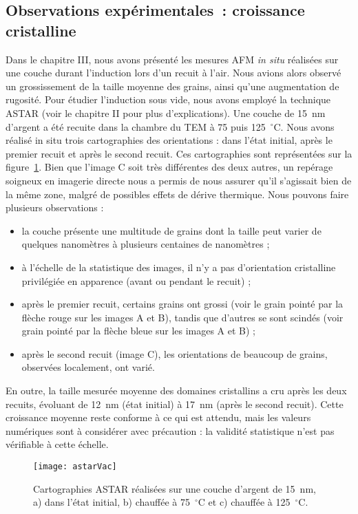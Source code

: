		\subsection{Observations expérimentales~: croissance cristalline}
Dans le chapitre III, nous avons présenté les mesures AFM \textit{in situ} réalisées sur une couche durant l’induction lors d’un recuit à l’air. Nous avions alors observé un grossissement de la taille moyenne des grains, ainsi qu’une augmentation de rugosité. Pour étudier l’induction sous vide, nous avons employé la technique ASTAR (voir le chapitre II pour plus d’explications). Une couche de 15~nm d’argent a été recuite dans la chambre du TEM à 75 puis 125~$^\circ$C. Nous avons réalisé in situ trois cartographies des orientations : dans l’état initial, après le premier recuit et après le second recuit. Ces cartographies sont représentées sur la figure~\ref{astarVac}. Bien que l’image C soit très différentes des deux autres, un repérage soigneux en imagerie directe nous a permis de nous assurer qu’il s’agissait bien de la même zone, malgré de possibles effets de dérive thermique. Nous pouvons faire plusieurs observations :
\begin{itemize}
\item la couche présente une multitude de grains dont la taille peut varier de quelques nanomètres à plusieurs centaines de nanomètres ;
\item à l'échelle de la statistique des images, il n’y a pas d’orientation cristalline privilégiée en apparence (avant ou pendant le recuit) ;
\item après le premier recuit, certains grains ont grossi (voir le grain pointé par la flèche rouge sur les images A et B), tandis que d’autres se sont scindés (voir grain pointé par la flèche bleue sur les images A et B) ;
\item après le second recuit (image C), les orientations de beaucoup de grains, observées localement, ont varié.
\end{itemize}
En outre, la taille mesurée moyenne des domaines cristallins a cru après les deux recuits, évoluant de 12~nm (état initial) à 17~nm (après le second recuit). Cette croissance moyenne reste conforme à ce qui est attendu, mais les valeurs numériques sont à considérer avec précaution : la validité statistique n’est pas vérifiable à cette échelle.\par 
\begin{figure}[!htb]
\centering
\texttt{[image: astarVac]}
\caption{Cartographies ASTAR réalisées sur une couche d’argent de 15~nm, a) dans l’état initial, b) chauffée à 75~$^\circ$C et c) chauffée à 125~$^\circ$C.}
\label{astarVac}
\end{figure}
